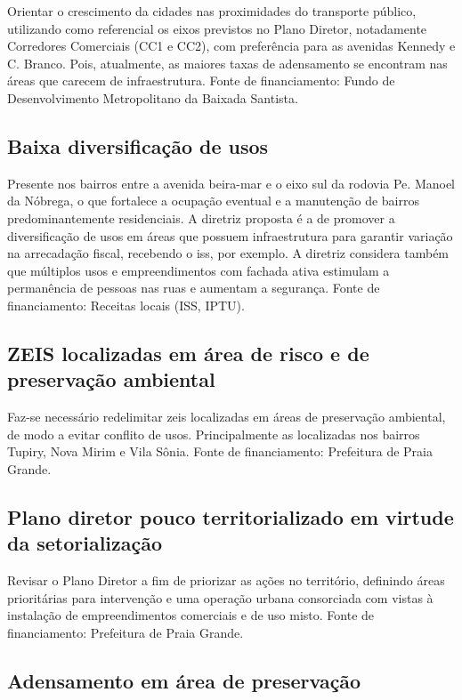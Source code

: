 	Orientar o crescimento da cidades nas proximidades do transporte público, utilizando como referencial os eixos previstos no Plano Diretor, notadamente Corredores Comerciais (CC1 e CC2), com preferência para as avenidas Kennedy e C. Branco. Pois, atualmente, as maiores taxas de adensamento se encontram nas áreas que carecem de infraestrutura. Fonte de financiamento: Fundo de Desenvolvimento Metropolitano da Baixada Santista.
	
	\subsection{Baixa diversificação de usos}
	
	Presente nos bairros entre a avenida beira-mar e o eixo sul da rodovia Pe. Manoel da Nóbrega, o que fortalece a ocupação eventual e a manutenção de bairros predominantemente residenciais. A diretriz proposta é a de promover a diversificação de usos em áreas que possuem infraestrutura para garantir variação na arrecadação fiscal, recebendo o \gls{iss}, por exemplo. A diretriz considera também que múltiplos usos e empreendimentos com fachada ativa estimulam a permanência de pessoas nas ruas e aumentam a segurança. Fonte de financiamento: Receitas locais (ISS, IPTU).
	
	\subsection{ZEIS localizadas em área de risco e de preservação ambiental}
	
	Faz-se necessário redelimitar \gls{zeis} localizadas em áreas de preservação ambiental, de modo a evitar conflito de usos. Principalmente as localizadas nos bairros Tupiry, Nova Mirim e Vila Sônia. Fonte de financiamento: Prefeitura de Praia Grande.
	
	\subsection{Plano diretor pouco territorializado em virtude da setorialização}
	
	Revisar o Plano Diretor a fim de priorizar as ações no território, definindo áreas prioritárias para intervenção e uma operação urbana consorciada com vistas à instalação de empreendimentos comerciais e de uso misto. Fonte de financiamento: Prefeitura de Praia Grande.
	
	\subsection{Adensamento em área de preservação}
	
